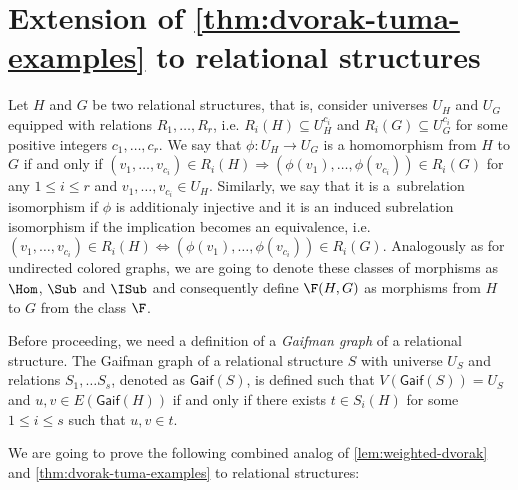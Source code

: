 \section{Extension of \cref{thm:dvorak-tuma-examples} to relational structures } \label{app:relations}


Let $H$ and $G$ be two relational structures, that is, consider universes $U_H$ and $U_G$ equipped with relations $R_1, \ldots, R_r$, i.e. $R_i(H) \subseteq U_H^{c_i}$ and $R_i(G) \subseteq U_G^{c_i}$ for some positive integers $c_1, \ldots, c_r$. We say that $\phi : U_H \to U_G$ is a homomorphism from $H$ to $G$ if and only if $(v_1, \ldots, v_{c_i}) \in R_i(H) \Rightarrow (\phi(v_1), \ldots, \phi(v_{c_i})) \in R_i(G)$ for any $1 \le i \le r$ and $v_1, \ldots, v_{c_i} \in U_H$. Similarly, we say that it is a~subrelation isomorphism if $\phi$ is additionaly injective and it is an induced subrelation isomorphism if the implication becomes an equivalence, i.e. $(v_1, \ldots, v_{c_i}) \in R_i(H) \Leftrightarrow (\phi(v_1), \ldots, \phi(v_{c_i})) \in R_i(G)$. Analogously as for undirected colored graphs, we are going to denote these classes of morphisms as $\Hom$, $\Sub$ and $\ISub$ and consequently define $\F(H, G)$ as morphisms from $H$ to $G$ from the class $\F$.

Before proceeding, we need a definition of a \textit{Gaifman graph} of a relational structure. The Gaifman graph of a relational structure $S$ with universe $U_S$ and relations $S_1, \ldots S_s$, denoted as $\mathsf{Gaif}(S)$, is defined such that $V(\mathsf{Gaif}(S)) = U_S$ and $u, v \in E(\mathsf{Gaif}(H))$ if and only if there exists $t \in S_i(H)$ for some $1 \le i \le s$ such that $u, v \in t$. 



We are going to prove the following combined analog of \ref{lem:weighted-dvorak} and \ref{thm:dvorak-tuma-examples} to relational structures:

